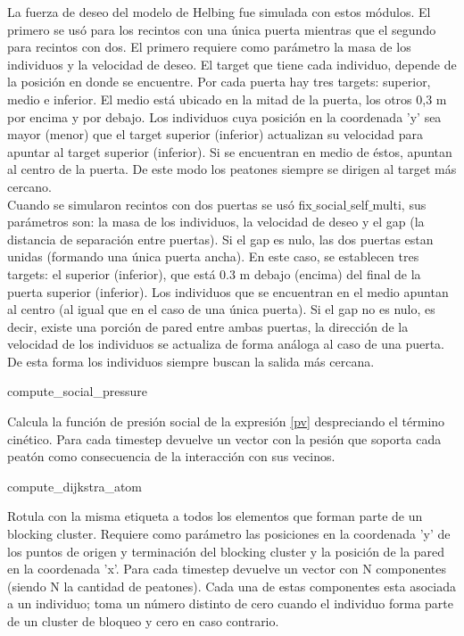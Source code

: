 La fuerza de deseo del modelo de Helbing fue simulada con estos módulos. El primero se usó para los recintos con una única puerta mientras que el segundo para recintos con dos. 
El primero requiere como parámetro la masa de los individuos y la velocidad de deseo. El target que tiene cada individuo, depende de la posición en donde se encuentre. Por cada puerta hay tres targets: superior, medio e inferior. El medio está ubicado en la mitad de la puerta, los otros 0,3 m por encima y por debajo.  Los individuos cuya posición en la coordenada 'y' sea mayor (menor) que el target superior (inferior) actualizan su velocidad para apuntar al target superior (inferior). Si se encuentran en medio de éstos, apuntan al centro de la puerta. De este modo los peatones siempre se dirigen al target más cercano.\\  
Cuando se simularon recintos con dos puertas se usó fix$\_$social$\_$self$\_$multi, sus parámetros son: la masa de los individuos, la velocidad de deseo y el gap (la distancia de separación entre puertas). Si el gap es nulo, las dos puertas estan unidas (formando una única puerta ancha). En este caso, se establecen tres targets: el superior (inferior), que está 0.3 m debajo (encima) del final de la puerta superior (inferior). Los individuos que se encuentran en el medio apuntan al centro (al igual que en el caso de una única puerta).
Si el gap no es nulo, es decir, existe una porción de pared entre ambas puertas, la dirección de la velocidad de los individuos se actualiza de forma análoga al caso de una puerta. De esta forma los individuos siempre buscan la salida más cercana. 

{\Large compute\_social\_pressure}

Calcula la función de presión social de la expresión \eqref{pv} despreciando el término cinético. Para cada timestep devuelve un vector con la pesión que soporta cada peatón como consecuencia de la interacción con sus vecinos. 

{\Large compute\_dijkstra\_atom}

Rotula con la misma etiqueta a todos los elementos que forman parte de un blocking cluster. Requiere como parámetro las posiciones en la coordenada 'y' de los puntos de origen y terminación del blocking cluster y la posición de la pared en la coordenada 'x'. Para cada timestep devuelve un vector con N componentes (siendo N la cantidad de peatones). Cada una de estas componentes esta asociada a un individuo; toma un número distinto de cero cuando el individuo forma parte de un cluster de bloqueo y cero en caso contrario. 


